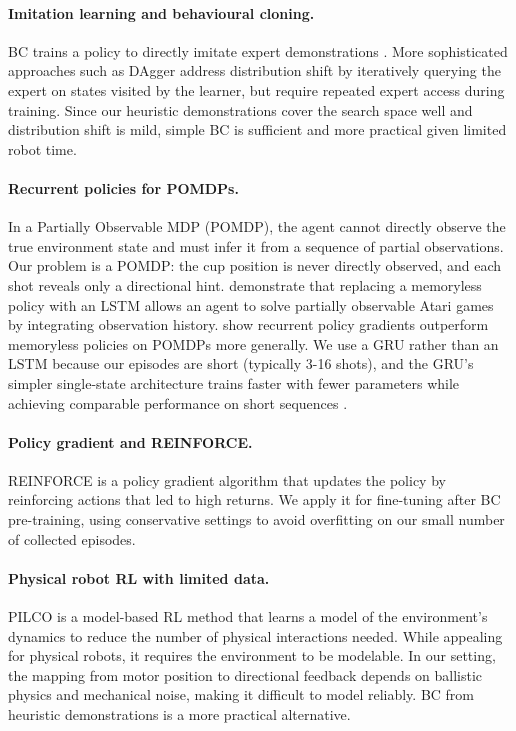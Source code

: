 \documentclass[twoside,11pt]{article}
\begin{document}
\paragraph{Imitation learning and behavioural cloning.}
BC trains a policy to directly imitate expert demonstrations
\citep{pomerleau1988alvinn}. More sophisticated approaches such as DAgger
\citep{ross2011reduction} address distribution shift by iteratively querying
the expert on states visited by the learner, but require repeated expert access
during training. Since our heuristic demonstrations cover the search space well
and distribution shift is mild, simple BC is sufficient and more practical
given limited robot time.

\paragraph{Recurrent policies for POMDPs.}
In a Partially Observable MDP (POMDP), the agent cannot directly observe the
true environment state and must infer it from a sequence of partial
observations. Our problem is a POMDP: the cup position is never directly
observed, and each shot reveals only a directional hint.
\citet{hausknecht2015deep} demonstrate that replacing a memoryless policy with
an LSTM allows an agent to solve partially observable Atari games by
integrating observation history. \citet{wierstra2010recurrent} show recurrent
policy gradients outperform memoryless policies on POMDPs more generally. We
use a GRU rather than an LSTM because our episodes are short (typically 3-16
shots), and the GRU's simpler single-state architecture trains faster with
fewer parameters while achieving comparable performance on short sequences
\citep{chung2014empirical}.

\paragraph{Policy gradient and REINFORCE.}
REINFORCE \citep{williams1992simple} is a policy gradient algorithm that
updates the policy by reinforcing actions that led to high returns. We apply it
for fine-tuning after BC pre-training, using conservative settings to avoid
overfitting on our small number of collected episodes.

\paragraph{Physical robot RL with limited data.}
PILCO \citep{deisenroth2011pilco} is a model-based RL method that learns a
model of the environment's dynamics to reduce the number of physical
interactions needed. While appealing for physical robots, it requires the
environment to be modelable. In our setting, the mapping from motor position to
directional feedback depends on ballistic physics and mechanical noise, making
it difficult to model reliably. BC from heuristic demonstrations is a more
practical alternative.
\end{document}
